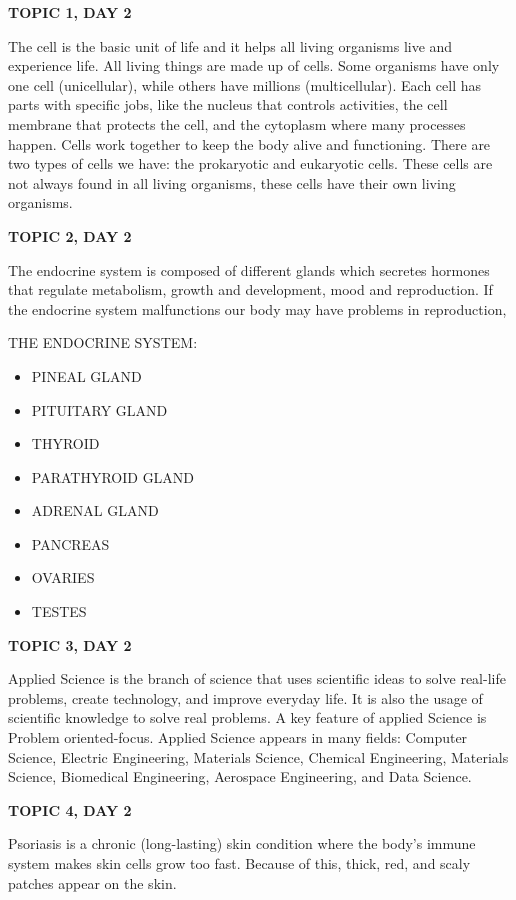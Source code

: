 {{{{{\textbf{TOPIC 1, DAY 2}


The cell is the basic unit of life and it helps all living organisms live and experience life. All living things are made up of cells. Some organisms have only one cell (unicellular), while others have millions (multicellular). Each cell has parts with specific jobs, like the nucleus that controls activities, the cell membrane that protects the cell, and the cytoplasm where many processes happen. Cells work together to keep the body alive and functioning. There are two types of cells we have: the prokaryotic and eukaryotic cells. These cells are not always found in all living organisms, these cells have their own living organisms.

\textbf{TOPIC 2, DAY 2}

The endocrine system is composed of different glands which secretes hormones 
that regulate metabolism, growth and development, mood and reproduction. If the endocrine system malfunctions our body may have problems in reproduction, 


THE ENDOCRINE SYSTEM:
\begin{itemize}
    \item PINEAL GLAND
    \item PITUITARY GLAND
    \item THYROID 
    \item PARATHYROID GLAND
    \item ADRENAL GLAND
    \item PANCREAS
    \item OVARIES 
    \item TESTES
\end{itemize}

\textbf{TOPIC 3, DAY 2}


Applied Science is the branch of science that uses scientific ideas to solve real-life problems, create technology, and improve everyday life. It is also the usage of scientific knowledge to solve real problems. A key feature of applied Science is Problem oriented-focus. 
Applied Science appears in many fields: Computer Science, Electric Engineering, Materials Science, Chemical Engineering, Materials Science, Biomedical Engineering, Aerospace Engineering, and Data Science.

\textbf{TOPIC 4, DAY 2}


Psoriasis is a chronic (long-lasting) skin condition where the body's immune system makes skin cells grow too fast. Because of this, thick, red, and scaly patches appear on the skin.


}}}}}
